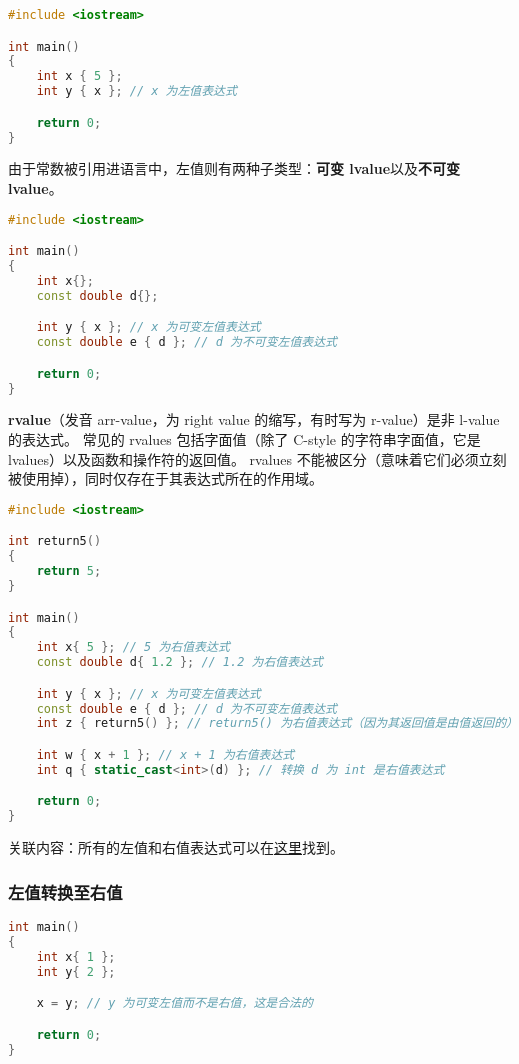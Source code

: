 \documentclass[../../LearnCpp.tex]{subfiles}
\begin{document}
\begin{lstlisting}[language=C++]
#include <iostream>

int main()
{
    int x { 5 };
    int y { x }; // x 为左值表达式

    return 0;
}
\end{lstlisting}

由于常数被引用进语言中，左值则有两种子类型：\textbf{可变 lvalue}以及\textbf{不可变 lvalue}。

\begin{lstlisting}[language=C++]
#include <iostream>

int main()
{
    int x{};
    const double d{};

    int y { x }; // x 为可变左值表达式
    const double e { d }; // d 为不可变左值表达式

    return 0;
}
\end{lstlisting}

\textbf{rvalue}（发音 arr-value，为 right value 的缩写，有时写为 r-value）是非 l-value 的表达式。
常见的 rvalues 包括字面值（除了 C-style 的字符串字面值，它是 lvalues）以及函数和操作符的返回值。
rvalues 不能被区分（意味着它们必须立刻被使用掉），同时仅存在于其表达式所在的作用域。

\begin{lstlisting}[language=C++]
#include <iostream>

int return5()
{
    return 5;
}

int main()
{
    int x{ 5 }; // 5 为右值表达式
    const double d{ 1.2 }; // 1.2 为右值表达式

    int y { x }; // x 为可变左值表达式
    const double e { d }; // d 为不可变左值表达式
    int z { return5() }; // return5() 为右值表达式（因为其返回值是由值返回的）

    int w { x + 1 }; // x + 1 为右值表达式
    int q { static_cast<int>(d) }; // 转换 d 为 int 是右值表达式

    return 0;
}
\end{lstlisting}

关联内容：所有的左值和右值表达式可以在\href{https://en.cppreference.com/w/cpp/language/value\_category}{这里}找到。

\subsubsection*{左值转换至右值}

\begin{lstlisting}[language=C++]
int main()
{
    int x{ 1 };
    int y{ 2 };

    x = y; // y 为可变左值而不是右值，这是合法的

    return 0;
}
\end{lstlisting}
\end{document}
